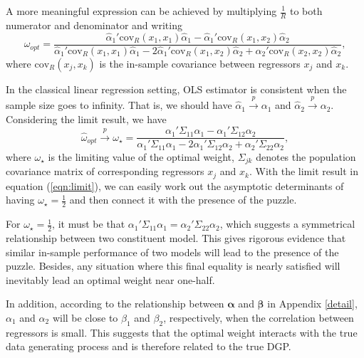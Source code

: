 \documentclass{monashthesis}
\begin{document}
A more meaningful expression can be achieved by multiplying \(\frac{1}{R}\) to both numerator and denominator and writing
\begin{equation*}
\label{eqn:opt}
\hat\omega_{opt} = \frac{\hat\alpha_1'\text{cov}_R(x_1,x_1)\hat\alpha_1 - \hat\alpha_1'\text{cov}_R(x_1,x_2)\hat\alpha_2}{\hat\alpha_1' \text{cov}_R(x_1,x_1)\hat\alpha_1 - 2\hat\alpha_1'\text{cov}_R(x_1,x_2)\hat\alpha_2 + \hat\alpha_2'\text{cov}_R(x_2,x_2)\hat\alpha_2},
\end{equation*}
where \(\text{cov}_R(x_j,x_k)\) is the in-sample covariance between regressors \(x_j\) and \(x_k\).

In the classical linear regression setting, OLS estimator is consistent when the sample size goes to infinity. That is, we should have \(\hat\alpha_1 \overset{p}{\to} \alpha_1\) and \(\hat\alpha_2 \overset{p}{\to} \alpha_2\). Considering the limit result, we have
\begin{equation}
\label{eqn:limit}
\hat\omega_{opt} \overset{p}{\to} \omega_\star = \frac{\alpha_1'\Sigma_{11}\alpha_1 - \alpha_1'\Sigma_{12}\alpha_2}{\alpha_1'\Sigma_{11}\alpha_1 - 2\alpha_1'\Sigma_{12}\alpha_2 + \alpha_2'\Sigma_{22}\alpha_2},
\end{equation}
where \(\omega_\star\) is the limiting value of the optimal weight, \(\Sigma_{jk}\) denotes the population covariance matrix of corresponding regressors \(x_j\) and \(x_k\). With the limit result in equation (\ref{eqn:limit}), we can easily work out the asymptotic determinants of having \(\omega_\star=\frac{1}{2}\) and then connect it with the presence of the puzzle.

For \(\omega_\star=\frac{1}{2}\), it must be that \(\alpha_1'\Sigma_{11}\alpha_1 = \alpha_2'\Sigma_{22}\alpha_2\), which suggests a symmetrical relationship between two constituent model. This gives rigorous evidence that similar in-sample performance of two models will lead to the presence of the puzzle. Besides, any situation where this final equality is nearly satisfied will inevitably lead an optimal weight near one-half.

In addition, according to the relationship between \(\pmb \alpha\) and \(\pmb \beta\) in Appendix \ref{detail}, \(\alpha_1\) and \(\alpha_2\) will be close to \(\beta_1\) and \(\beta_2\), respectively, when the correlation between regressors is small. This suggests that the optimal weight interacts with the true data generating process and is therefore related to the true DGP.
\end{document}
